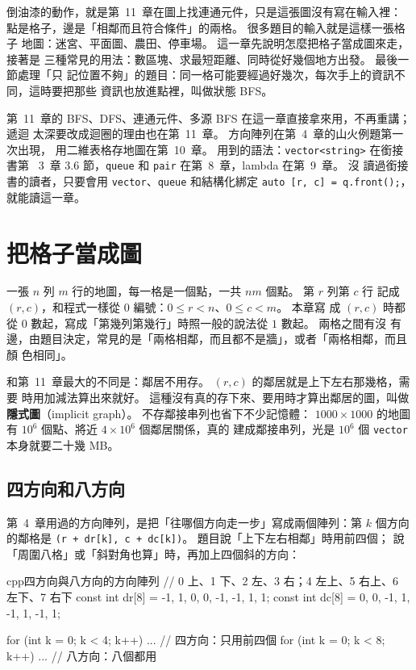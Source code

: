 倒油漆的動作，就是第~11~章在圖上找連通元件，只是這張圖沒有寫在輸入裡：
點是格子，邊是「相鄰而且符合條件」的兩格。 很多題目的輸入就是這樣一張格子
地圖：迷宮、平面圖、農田、停車場。 這一章先說明怎麼把格子當成圖來走，接著是
三種常見的用法：數區塊、求最短距離、同時從好幾個地方出發。 最後一節處理「只
記位置不夠」的題目：同一格可能要經過好幾次，每次手上的資訊不同，這時要把那些
資訊也放進點裡，叫做狀態 BFS。

第~11~章的 BFS、DFS、連通元件、多源 BFS 在這一章直接拿來用，不再重講；遞迴
太深要改成迴圈的理由也在第~11~章。 方向陣列在第~4~章的山火例題第一次出現，
用二維表格存地圖在第~10~章。 用到的語法：\texttt{vector<string>} 在銜接書第
~3~章 3.6 節，\texttt{queue} 和 \texttt{pair} 在第~8~章，lambda 在第~9~章。 沒
讀過銜接書的讀者，只要會用 \texttt{vector}、\texttt{queue} 和結構化綁定
\texttt{auto [r, c] = q.front();}，就能讀這一章。

\section{把格子當成圖}
\label{sec:grid-graph}

一張 $n$ 列 $m$ 行的地圖，每一格是一個點，一共 $nm$ 個點。 第 $r$ 列第 $c$ 行
記成 $(r, c)$，和程式一樣從 $0$ 編號：$0 \le r < n$、$0 \le c < m$。 本章寫
成 $(r, c)$ 時都從 $0$ 數起，寫成「第幾列第幾行」時照一般的說法從 $1$ 數起。 兩格之間有沒
有邊，由題目決定，常見的是「兩格相鄰，而且都不是牆」，或者「兩格相鄰，而且顏
色相同」。

和第~11~章最大的不同是：鄰居不用存。 $(r, c)$ 的鄰居就是上下左右那幾格，需要
時用加減法算出來就好。 這種沒有真的存下來、要用時才算出鄰居的圖，叫做
\textbf{隱式圖}（implicit graph）。 不存鄰接串列也省下不少記憶體：
$1000 \times 1000$ 的地圖有 $10^6$ 個點、將近 $4 \times 10^6$ 個鄰居關係，真的
建成鄰接串列，光是 $10^6$ 個 \texttt{vector} 本身就要二十幾 MB。

\subsection{四方向和八方向}

第~4~章用過的方向陣列，是把「往哪個方向走一步」寫成兩個陣列：第 $k$ 個方向
的鄰格是 \texttt{(r + dr[k], c + dc[k])}。 題目說「上下左右相鄰」時用前四個；
說「周圍八格」或「斜對角也算」時，再加上四個斜的方向：

\begin{code}{cpp}{四方向與八方向的方向陣列}
// 0 上、1 下、2 左、3 右；4 左上、5 右上、6 左下、7 右下
const int dr[8] = {-1, 1, 0, 0, -1, -1, 1, 1};
const int dc[8] = {0, 0, -1, 1, -1, 1, -1, 1};

for (int k = 0; k < 4; k++) { ... }   // 四方向：只用前四個
for (int k = 0; k < 8; k++) { ... }   // 八方向：八個都用
\end{code}

